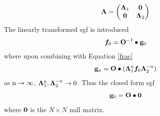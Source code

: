 \documentclass[a4paper, 12pt]{article}
\begin{document}
	\begin{equation}
		\bm \Lambda = \begin{pmatrix} \bm \Lambda_1&\bf 0\\\bf 0&\bm \Lambda_2 \end{pmatrix}
	\end{equation}
	The linearly transformed \gls{sgf} is introduced
	\begin{equation}\label{f}
		\bm f_0 = {\bf O}^{-1}\bullet {\bf g}_0
	\end{equation}
	where upon combining with Equation \eqref{frac}
	\begin{equation}\label{glam}
		{\bf g}_{\rm n} = {\bf O}\bullet(\bm\Lambda_1^{\rm n}\bm f_0\bm\Lambda_2^{-\rm n})
	\end{equation}
	as $\rm n\rightarrow\infty$, \quad $\bm\Lambda_1^{\rm n}, \bm\Lambda_2^{-\rm n}\rightarrow 0$. Thus the closed form \gls{sgf} 
\begin{equation}\label{SGF_AU}
	{\bf g}_0 = {\bf O} \bullet {\bf 0}
\end{equation}
where $\bf 0$ is the $N\times N$ null matrix.
\end{document}
